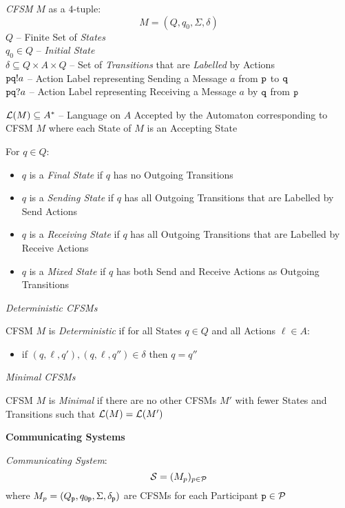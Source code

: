 \emph{CFSM} $M$ as a $4$-tuple:
\[
  M = (Q, q_0, \Sigma, \delta)
\]
$Q$ -- Finite Set of \emph{States} \\
$q_0 \in Q$ -- \emph{Initial State} \\
$\delta \subseteq Q \times A \times Q$ -- Set of \emph{Transitions}
that are \emph{Labelled} by Actions \\

$\mathtt{pq}!a$ -- Action Label representing Sending a Message $a$ from
$\mathtt{p}$ to $\mathtt{q}$ \\
$\mathtt{pq}?a$ -- Action Label representing Receiving a Message $a$ by
$\mathtt{q}$ from $\mathtt{p}$

$\mathcal{L}(M) \subseteq A^*$ -- Language on $A$ Accepted by the
Automaton corresponding to CFSM $M$ where each State of $M$ is an
Accepting State %

For $q \in Q$:
\begin{itemize}
  \item $q$ is a \emph{Final State} if $q$ has no Outgoing Transitions
  \item $q$ is a \emph{Sending State} if $q$ has all Outgoing
    Transitions that are Labelled by Send Actions
  \item $q$ is a \emph{Receiving State} if $q$ has all Outgoing
    Transitions that are Labelled by Receive Actions
  \item $q$ is a \emph{Mixed State} if $q$ has both Send and
    Receive Actions as Outgoing Transitions
\end{itemize}

\emph{Deterministic CFSMs}

CFSM $M$ is \emph{Deterministic} if for all States $q \in Q$ and all
Actions $\ell \in A$:
\begin{itemize}
  \item if $(q,\ell,q'),(q,\ell,q'') \in \delta$ then $q = q''$
\end{itemize}

\emph{Minimal CFSMs}

CFSM $M$ is \emph{Minimal} if there are no other CFSMs $M'$ with fewer
States and Transitions such that $\mathcal{L}(M) = \mathcal{L}(M')$


\textbf{Communicating Systems}

\emph{Communicating System}:
\[
  \mathcal{S} = (M_p)_{p \in \mathcal{P}}
\]
where $M_p = (Q_\mathtt{p}, q_{0\mathtt{p}}, \Sigma, \delta_\mathtt{p})$
are CFSMs for each Participant $\mathtt{p} \in \mathcal{P}$

